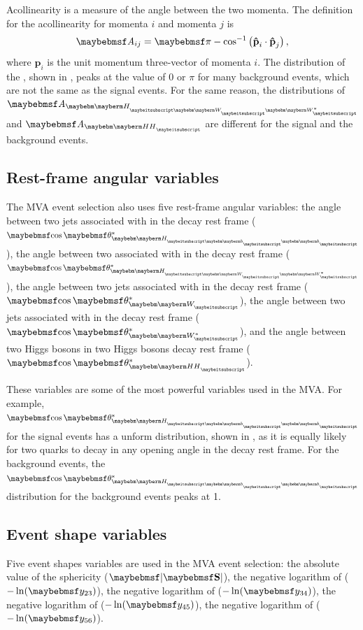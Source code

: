 Acollinearity is a measure of the angle between the two momenta. The definition for the acollinearity for momenta $i$ and momenta $j$ is
\begin{equation}
\acolinearity{ij} = \pi - \cos^{-1}\left(\textbf{\^{p}}_i\cdot\textbf{\^{p}}_j\right),
\end{equation}
where $\textbf{\^{p}}_i$ is the unit momentum three-vector of momenta $i$. The distribution of the \acolinearity{\Hbb}, shown in , peaks at the value of 0 or $\pi$ for many background events, which are not the same as the signal events. For the same reason, the distributions of $\acolinearity{\HWW}$ and $\acolinearity{\HH}$ are different for the signal and the background events.

\subsection{Rest-frame angular variables}

The MVA event selection also uses five rest-frame angular variables: the angle between two jets associated with \Hbb in the \Hbb decay rest frame ($\cosStar{\Hbb}$), the angle between two  associated with \HWW in the \HWW decay rest frame ($\cosStar{\HWW}$), the angle between two jets associated with \PW in the \PW decay rest frame ($\cosStar{\PW}$), the angle between two jets associated with \W* in the \W* decay rest frame ($\cosStar{\W*}$), and the angle between two Higgs bosons in two Higgs bosons decay rest frame ($\cosStar{\HH}$).

These variables are some of the most powerful variables used in the MVA. For example, $\cosStar{\Hbb}$ for  the signal events has a unform distribution, shown in , as it is equally likely for two quarks to decay in any opening angle in the \Hbb decay rest frame. For the background events, the  $\cosStar{\Hbb}$ distribution for the background events peaks at 1.

\subsection{Event shape variables}

Five event shapes variables are used in the MVA event selection: the absolute value of the sphericity ($\abs{\sphericity}$), the negative logarithm of  ($-\ln(\y{23})$), the negative logarithm of  ($-\ln(\y{34})$), the negative logarithm of  ($-\ln(\y{45})$), the negative logarithm of  ($-\ln(\y{56})$).

